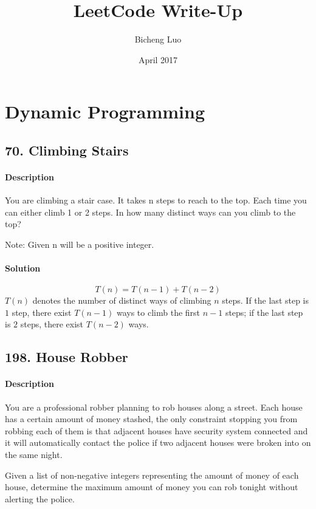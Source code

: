 \documentclass{article}
\title{LeetCode Write-Up}
\author{Bicheng Luo}
\date{April 2017}
\begin{document}
\maketitle

\section{Dynamic Programming}

\subsection{70. Climbing Stairs}

\paragraph{Description}

You are climbing a stair case. It takes n steps to reach to the top.
Each time you can either climb 1 or 2 steps. In how many distinct ways can you climb to the top?

Note: Given n will be a positive integer.

\paragraph{Solution}

$$T(n)=T(n-1)+T(n-2)$$
$T(n)$ denotes the number of distinct ways of climbing $n$ steps. If the last step is $1$ step, there exist $T(n-1)$ ways to climb the first $n-1$ steps; if the last step is $2$ steps, there exist $T(n-2)$ ways.

\subsection{198. House Robber}

\paragraph{Description}

You are a professional robber planning to rob houses along a street. Each house has a certain amount of money stashed, the only constraint stopping you from robbing each of them is that adjacent houses have security system connected and it will automatically contact the police if two adjacent houses were broken into on the same night.

Given a list of non-negative integers representing the amount of money of each house, determine the maximum amount of money you can rob tonight without alerting the police.
\end{document}

